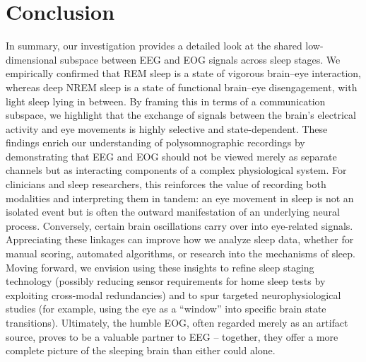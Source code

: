 \section{Conclusion}

In summary, our investigation provides a detailed look at the shared low-dimensional subspace between EEG and EOG signals across sleep stages. We empirically confirmed that REM sleep is a state of vigorous brain–eye interaction, whereas deep NREM sleep is a state of functional brain–eye disengagement, with light sleep lying in between. By framing this in terms of a communication subspace, we highlight that the exchange of signals between the brain’s electrical activity and eye movements is highly selective and state-dependent. These findings enrich our understanding of polysomnographic recordings by demonstrating that EEG and EOG should not be viewed merely as separate channels but as interacting components of a complex physiological system. For clinicians and sleep researchers, this reinforces the value of recording both modalities and interpreting them in tandem: an eye movement in sleep is not an isolated event but is often the outward manifestation of an underlying neural process. Conversely, certain brain oscillations carry over into eye-related signals. Appreciating these linkages can improve how we analyze sleep data, whether for manual scoring, automated algorithms, or research into the mechanisms of sleep. Moving forward, we envision using these insights to refine sleep staging technology (possibly reducing sensor requirements for home sleep tests by exploiting cross-modal redundancies) and to spur targeted neurophysiological studies (for example, using the eye as a “window” into specific brain state transitions). Ultimately, the humble EOG, often regarded merely as an artifact source, proves to be a valuable partner to EEG – together, they offer a more complete picture of the sleeping brain than either could alone.

\renewcommand{\baselinestretch}{1.5}
\cleardoublepage    %



